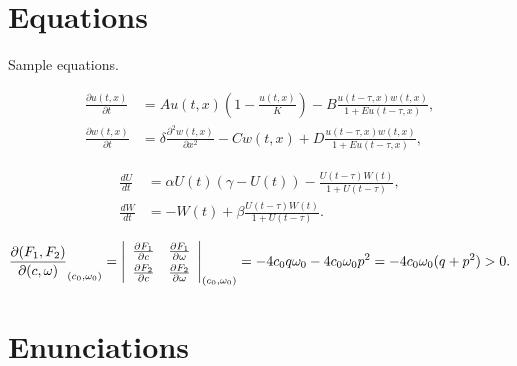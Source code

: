 \documentclass[preprint,pteplogo]{ptephy_v2}%
\begin{document}
\section{Equations}

Sample equations.

\begin{equation}\label{1.1}
\begin{split}
\frac{\partial u(t,x)}{\partial t} &= Au(t,x) \left(1-\frac{u(t,x)}{K}\right)-B\frac{u(t-\tau,x) w(t,x)}{1+Eu(t-\tau,x)},\\
\frac{\partial w(t,x)}{\partial t} &=\delta \frac{\partial^2w(t,x)}{\partial x^2}-Cw(t,x)+D\frac{u(t-\tau,x)w(t,x)}{1+Eu(t-\tau,x)},
\end{split}
\end{equation}

\begin{equation}\label{1.2}
\begin{split}
\frac{dU}{dt} &=\alpha U(t)(\gamma -U(t))-\frac{U(t-\tau)W(t)}{1+U(t-\tau)},\\
\frac{dW}{dt} &=-W(t)+\beta\frac{U(t-\tau)W(t)}{1+U(t-\tau)}.
\end{split}
\end{equation}

\[
\frac{\partial(F_1,F_2)}{\partial(c,\omega)}_{(c_0,\omega_0)} = \left|
\begin{array}{ll}
\frac{\partial F_1}{\partial c} &\frac{\partial F_1}{\partial \omega} \\\noalign{\vskip3pt}
\frac{\partial F_2}{\partial c}&\frac{\partial F_2}{\partial \omega}
\end{array}\right|_{(c_0,\omega_0)}=-4c_0q\omega_0 -4c_0\omega_0p^2 =-4c_0\omega_0(q+p^2)>0.
\]

\section{Enunciations}



\end{document}
